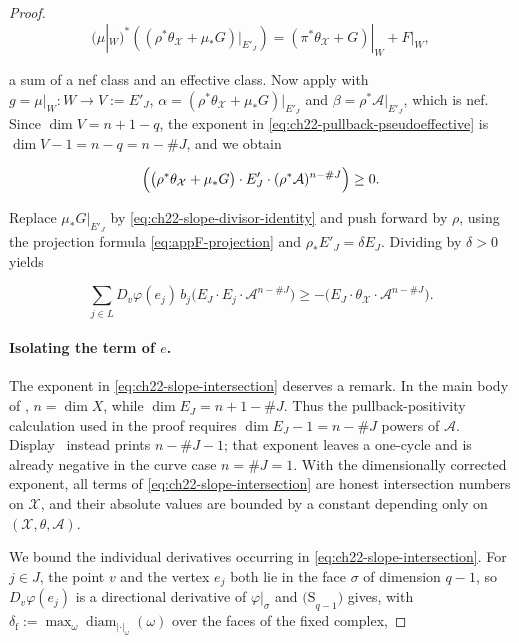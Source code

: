\begin{proof}
\[
 (\mu|_W)^*\!\left(
   (\rho^*\theta_{\mathcal X}+\mu_*G)|_{E'_J}\right)
   =(\pi^*\theta_{\mathcal X}+G)|_W+F|_W,
\tag{22.46}\label{eq:ch22-nef-effective-decomposition}
\]

a sum of a nef class and an effective class.  Now apply
 with $g=\mu|_W:W\to V:=E'_J$,
$\alpha=(\rho^*\theta_{\mathcal X}+\mu_*G)|_{E'_J}$ and
$\beta=\rho^*\mathcal A|_{E'_J}$, which is nef.  Since
$\dim V=n+1-q$, the exponent in
\eqref{eq:ch22-pullback-pseudoeffective} is $\dim V-1=n-q=n-\#J$, and we
obtain

\[
 \Bigl(\bigl(\rho^*\theta_{\mathcal X}+\mu_*G\bigr)\cdot E'_J\cdot
       (\rho^*\mathcal A)^{n-\#J}\Bigr)\geq0 .
\]

Replace $\mu_*G|_{E'_J}$ by \eqref{eq:ch22-slope-divisor-identity} and
push forward by $\rho$, using the projection formula
\eqref{eq:appF-projection} and $\rho_*E'_J=\delta E_J$.  Dividing by
$\delta>0$ yields

\[
 \sum_{j\in L}D_v\varphi(e_j)\,b_j
       \bigl(E_J\cdot E_j\cdot\mathcal A^{n-\#J}\bigr)
 \geq
 -\bigl(E_J\cdot\theta_{\mathcal X}\cdot
                         \mathcal A^{n-\#J}\bigr).
\tag{22.47}\label{eq:ch22-slope-intersection}
\]

\paragraph{Isolating the term of $e$.}
The exponent in \eqref{eq:ch22-slope-intersection} deserves a remark.  In
the main body of \cite{BFJ16}, $n=\dim X$, while
$\dim E_J=n+1-\#J$.  Thus the pullback-positivity calculation used in
the proof requires $\dim E_J-1=n-\#J$ powers of $\mathcal A$.
Display~\cite[(6.3)]{BFJ16} instead prints $n-\#J-1$; that exponent leaves
a one-cycle and is already negative in the curve case
$n=\#J=1$.  With the dimensionally corrected exponent, all terms of
\eqref{eq:ch22-slope-intersection} are honest intersection numbers on
$\mathcal X$, and their absolute values are bounded by a constant
depending only on $(\mathcal X,\theta,\mathcal A)$.

We bound the individual derivatives occurring in
\eqref{eq:ch22-slope-intersection}.  For $j\in J$, the point $v$ and the
vertex $e_j$ both lie in the face $\sigma$ of dimension $q-1$, so
$D_v\varphi(e_j)$ is a directional derivative of
$\varphi|_\sigma$ and $\mathrm{(S}_{q-1}\mathrm{)}$ gives, with
$\delta_{\mathrm f}:=\max_\omega\operatorname{diam}_{|\cdot|_\omega}
(\omega)$ over the faces of the fixed complex,


\end{proof}
